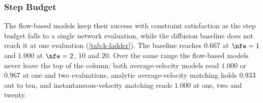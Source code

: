 \subsubsection{Step Budget}\label{sec:res:fewstep}

The flow-based models keep their success with constraint satisfaction as the step budget falls to a
single network evaluation, while the diffusion baseline does not reach it at one evaluation
(\autoref{tab:k-ladder}). The baseline reaches $0.667$ at $\nfe=1$ and $1.000$ at $\nfe=2$, $10$ and
$20$. Over the same range the flow-based models never leave the top of the column: both average-velocity
models read $1.000$ or $0.967$ at one and two evaluations, analytic average-velocity matching holds
$0.933$ out to ten, and instantaneous-velocity matching reads $1.000$ at one, two and twenty.

